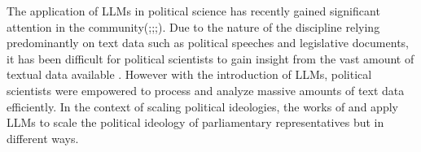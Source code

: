 \documentclass[final,5p,times,twocolumn,authoryear]{elsarticle}
\begin{document}
The application of LLMs in political science has recently gained significant attention in the community(\cite{LLMs-and-political-science};\cite{kato2024lupinllmbasedpoliticalideology};\cite{llm-latent-position-of-politicians};\cite{li2024politicalllmlargelanguagemodels}). Due to the nature of the discipline relying predominantly on text data such as political speeches and legislative documents, it has been difficult for political scientists to gain insight from the vast amount of textual data available \citep{li2024politicalllmlargelanguagemodels}. However with the introduction of LLMs, political scientists were empowered to process and analyze massive amounts of text data efficiently. In the context of scaling political ideologies, the works of  \citeauthor{kato2024lupinllmbasedpoliticalideology} and \citeauthor{llm-latent-position-of-politicians} apply LLMs to scale the political ideology of parliamentary representatives but in different ways. 
\end{document}
